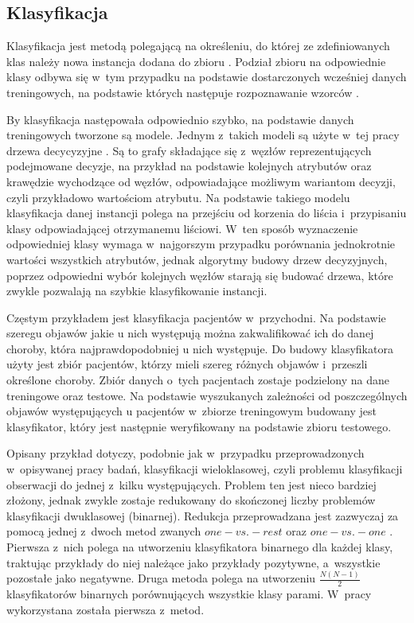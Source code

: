 \documentclass[a4paper,twoside,12pt]{book}
\begin{document}
\subsection{Klasyfikacja}
\label{roz:klasyfikacja}
Klasyfikacja jest metodą polegającą na określeniu, do której ze zdefiniowanych klas należy nowa instancja dodana do zbioru \cite{bib:classification}. Podział zbioru na odpowiednie klasy odbywa się w~tym przypadku na podstawie dostarczonych wcześniej danych treningowych, na podstawie których następuje rozpoznawanie wzorców \cite{bib:pattern}. 

By klasyfikacja następowała odpowiednio szybko, na podstawie danych treningowych tworzone są modele. Jednym z~takich modeli są użyte w~tej pracy drzewa decycyzyjne \cite{bib:decisionTree}. Są to grafy składające się z~węzłów reprezentujących podejmowane decyzje, na przykład na podstawie kolejnych atrybutów oraz krawędzie wychodzące od węzłów, odpowiadające możliwym wariantom decyzji, czyli przykładowo wartościom atrybutu. Na podstawie takiego modelu klasyfikacja danej instancji polega na przejściu od korzenia do liścia i~przypisaniu klasy odpowiadającej otrzymanemu liściowi. W~ten sposób wyznaczenie odpowiedniej klasy wymaga w~najgorszym przypadku porównania jednokrotnie wartości wszystkich atrybutów, jednak algorytmy budowy drzew decyzyjnych, poprzez odpowiedni wybór kolejnych węzłów starają się budować drzewa, które zwykle pozwalają na szybkie klasyfikowanie instancji.

Częstym przykładem jest klasyfikacja pacjentów w~przychodni. Na podstawie szeregu objawów jakie u nich występują można zakwalifikować ich do danej choroby, która najprawdopodobniej u nich występuje. Do budowy klasyfikatora użyty jest zbiór pacjentów, którzy mieli szereg różnych objawów i~przeszli określone choroby. Zbiór danych o~tych pacjentach zostaje podzielony na dane treningowe oraz testowe. Na podstawie wyszukanych zależności od poszczególnych objawów występujących u pacjentów w~zbiorze treningowym budowany jest klasyfikator, który jest następnie weryfikowany na podstawie zbioru testowego. 

Opisany przykład dotyczy, podobnie jak w~przypadku przeprowadzonych w~opisywanej pracy badań, klasyfikacji wieloklasowej, czyli problemu klasyfikacji obserwacji do jednej z~kilku występujących. Problem ten jest nieco bardziej złożony, jednak zwykle zostaje redukowany do skończonej liczby problemów klasyfikacji dwuklasowej (binarnej). Redukcja przeprowadzana jest zazwyczaj za pomocą jednej z~dwoch metod zwanych $one-vs.-rest$ oraz $one-vs.-one$ \cite{bib:oneversus}. Pierwsza z~nich polega na utworzeniu klasyfikatora binarnego dla każdej klasy, traktując przykłady do niej należące
jako przykłady pozytywne, a~wszystkie pozostałe jako negatywne. Druga metoda polega na utworzeniu $\frac{N(N-1)}{2}$ klasyfikatorów binarnych porównujących wszystkie klasy parami. W~pracy wykorzystana została pierwsza z~metod.
\end{document}
